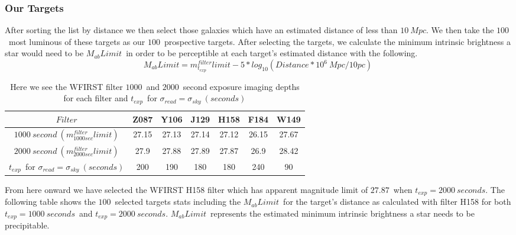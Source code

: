 \documentclass[11pt,a4paper,fleqn,notitlepage,oneside]{article}
\begin{document}
		\subsubsection{Our Targets} %
			\label{ssub:our_targets}
			After sorting the list by distance we then select those galaxies which have an estimated distance of less than $10\ Mpc$.
			We then take the $100$\ most luminous of these targets as our $100$\ prospective targets.
			After selecting the targets, we calculate the minimum intrinsic brightness a star would need to be $M_{ab}Limit$\ in order to be perceptible at each target's estimated distance with the following.
			\[
			M_{ab}Limit = m^{filter}_{t_{exp}}limit - 5 * log_{10}(Distance*10^{6}\ Mpc/10pc)\ 
			\]
			\begin{table}[H]\centering
				\label{tab:our_targets}
					\begin{tabular}{||c|cccccc||}
						\hline 
						$Filter$ & Z087 & Y106 & J129 & H158 & F184 & W149\\
						\midrule[1.5pt]
						$1000\ second\ (m^{filter}_{1000sec}limit) $ & 27.15 & 27.13 & 27.14 & 27.12 & 26.15 & 27.67\\
						$2000\ second\ (m^{filter}_{2000sec}limit) $ & 27.9 & 27.88 & 27.89 & 27.87 & 26.9 & 28.42\\
						$t_{exp}$\ for $\sigma_{read}=\sigma_{sky}\ (seconds)$ & 200 & 190 & 180 & 180 & 240 & 90\\
					\hline
					\end{tabular}
				\caption{
					Here we see the WFIRST filter $1000$\ and $2000$\ second exposure imaging depths for each filter and $t_{exp}$\ for $\sigma_{read}=\sigma_{sky}\ (seconds)$
					}
			\end{table}

			From here onward we have selected the WFIRST H158 filter which has apparent magnitude limit of $27.87$\ when $t_{exp}=2000\ seconds$.
			The following table shows the $100$\ selected targets stats including the $M_{ab}Limit$\ for the target's distance as calculated with filter H158 for both $t_{exp}=1000\ seconds$\ and $t_{exp}=2000\ seconds$.
			$M_{ab}Limit$\ represents the estimated minimum intrinsic brightness a star needs to be precipitable.
\end{document}
